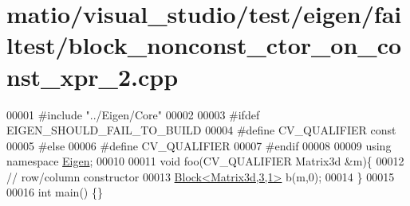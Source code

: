 \hypertarget{matio_2visual__studio_2test_2eigen_2failtest_2block__nonconst__ctor__on__const__xpr__2_8cpp_source}{}\section{matio/visual\+\_\+studio/test/eigen/failtest/block\+\_\+nonconst\+\_\+ctor\+\_\+on\+\_\+const\+\_\+xpr\+\_\+2.cpp}
\label{matio_2visual__studio_2test_2eigen_2failtest_2block__nonconst__ctor__on__const__xpr__2_8cpp_source}

\begin{DoxyCode}
00001 \textcolor{preprocessor}{#include "../Eigen/Core"}
00002 
00003 \textcolor{preprocessor}{#ifdef EIGEN\_SHOULD\_FAIL\_TO\_BUILD}
00004 \textcolor{preprocessor}{#define CV\_QUALIFIER const}
00005 \textcolor{preprocessor}{#else}
00006 \textcolor{preprocessor}{#define CV\_QUALIFIER}
00007 \textcolor{preprocessor}{#endif}
00008 
00009 \textcolor{keyword}{using namespace }\hyperlink{namespace_eigen}{Eigen};
00010 
00011 \textcolor{keywordtype}{void} foo(CV\_QUALIFIER Matrix3d &m)\{
00012     \textcolor{comment}{// row/column constructor}
00013     \hyperlink{group___core___module_class_eigen_1_1_block}{Block<Matrix3d,3,1>} b(m,0);
00014 \}
00015 
00016 \textcolor{keywordtype}{int} main() \{\}
\end{DoxyCode}

